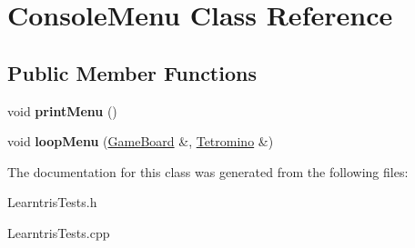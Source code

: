 \hypertarget{class_console_menu}{\section{Console\-Menu Class Reference}
\label{class_console_menu}
}
\subsection*{Public Member Functions}
\begin{DoxyCompactItemize}
\item 
\hypertarget{class_console_menu_afdb30b68130571db6e17b0b16c38b89e}{void {\bfseries print\-Menu} ()}\label{class_console_menu_afdb30b68130571db6e17b0b16c38b89e}

\item 
\hypertarget{class_console_menu_a2a0ab2d487585093bf006506a2dc7b65}{void {\bfseries loop\-Menu} (\hyperlink{class_game_board}{Game\-Board} \&, \hyperlink{class_tetromino}{Tetromino} \&)}\label{class_console_menu_a2a0ab2d487585093bf006506a2dc7b65}

\end{DoxyCompactItemize}


The documentation for this class was generated from the following files\-:\begin{DoxyCompactItemize}
\item 
Learntris\-Tests.\-h\item 
Learntris\-Tests.\-cpp\end{DoxyCompactItemize}
